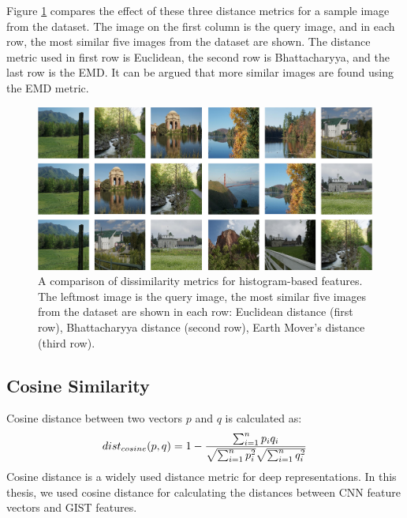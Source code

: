 Figure \ref{fig:sim_comp} compares the effect of these three distance metrics for a sample image from the dataset. The image on the first column is the query image, and in each row, the most similar five images from the dataset are shown. The distance metric used in first row is Euclidean, the second row is Bhattacharyya, and the last row is the EMD. It can be argued that more similar images are found using the EMD metric.

\begin{figure} 
\centering
\includegraphics[width=\textwidth]{figures/chapter2/16sims.png}
\vspace{10pt}
\caption{A comparison of dissimilarity metrics for histogram-based features. The leftmost image is the query image, the most similar five images from the dataset are shown in each row: Euclidean distance (first row), Bhattacharyya distance (second row), Earth Mover’s distance (third row).}
\label{fig:sim_comp}
\end{figure}

\subsection{Cosine Similarity}
Cosine distance between two vectors $p$ and $q$ is calculated as:
\begin{equation}
dist_{cosine}(p,q) = 1 - {{\sum_{i=1}^{n}p_{i}q_{i}} \over {\sqrt{\sum_{i=1}^{n}p_{i}^2}} \sqrt{\sum_{i=1}^{n}q_{i}^2}} 
\end{equation}
Cosine distance is a widely used distance metric for deep representations. In this thesis, we used cosine distance for calculating the distances between CNN feature vectors and GIST features.